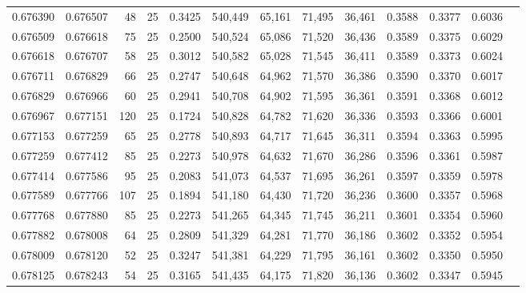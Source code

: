 \begin{tabular}{rrrrrrrrrrrrr}
0.676390 & 0.676507 &    48 &  25 &                                     0.3425 & 540,449 &  65,161 &  71,495 &  36,461 & 0.3588 & 0.3377 & 0.6036 \\
0.676509 & 0.676618 &    75 &  25 &                                     0.2500 & 540,524 &  65,086 &  71,520 &  36,436 & 0.3589 & 0.3375 & 0.6029 \\
0.676618 & 0.676707 &    58 &  25 &                                     0.3012 & 540,582 &  65,028 &  71,545 &  36,411 & 0.3589 & 0.3373 & 0.6024 \\
0.676711 & 0.676829 &    66 &  25 &                                     0.2747 & 540,648 &  64,962 &  71,570 &  36,386 & 0.3590 & 0.3370 & 0.6017 \\
0.676829 & 0.676966 &    60 &  25 &                                     0.2941 & 540,708 &  64,902 &  71,595 &  36,361 & 0.3591 & 0.3368 & 0.6012 \\
0.676967 & 0.677151 &   120 &  25 &                                     0.1724 & 540,828 &  64,782 &  71,620 &  36,336 & 0.3593 & 0.3366 & 0.6001 \\
0.677153 & 0.677259 &    65 &  25 &                                     0.2778 & 540,893 &  64,717 &  71,645 &  36,311 & 0.3594 & 0.3363 & 0.5995 \\
0.677259 & 0.677412 &    85 &  25 &                                     0.2273 & 540,978 &  64,632 &  71,670 &  36,286 & 0.3596 & 0.3361 & 0.5987 \\
0.677414 & 0.677586 &    95 &  25 &                                     0.2083 & 541,073 &  64,537 &  71,695 &  36,261 & 0.3597 & 0.3359 & 0.5978 \\
0.677589 & 0.677766 &   107 &  25 &                                     0.1894 & 541,180 &  64,430 &  71,720 &  36,236 & 0.3600 & 0.3357 & 0.5968 \\
0.677768 & 0.677880 &    85 &  25 &                                     0.2273 & 541,265 &  64,345 &  71,745 &  36,211 & 0.3601 & 0.3354 & 0.5960 \\
0.677882 & 0.678008 &    64 &  25 &                                     0.2809 & 541,329 &  64,281 &  71,770 &  36,186 & 0.3602 & 0.3352 & 0.5954 \\
0.678009 & 0.678120 &    52 &  25 &                                     0.3247 & 541,381 &  64,229 &  71,795 &  36,161 & 0.3602 & 0.3350 & 0.5950 \\
0.678125 & 0.678243 &    54 &  25 &                                     0.3165 & 541,435 &  64,175 &  71,820 &  36,136 & 0.3602 & 0.3347 & 0.5945 \\

\end{tabular}
